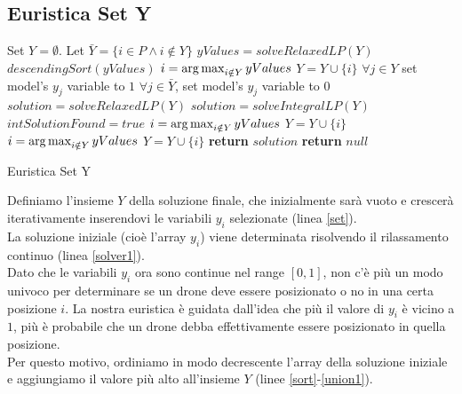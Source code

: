 \subsection{Euristica Set Y}
%
\begin{algorithm}
	\begin{algorithmic}[1]
		\State Set $ Y = \emptyset $. Let $ \bar{Y} = \{i \in P \land i \notin Y\}$ \label{set}
		\State $yValues = solveRelaxedLP(Y)$ \label{solver1}
		\State $descendingSort(yValues)$ \label{sort}
		\State $i = \operatorname*{arg\,max}_{i \notin Y} yValues $ \label{choose1} 
		\State $Y = Y \cup \{i\}$ \label{union1}
		 \label{while}
		\State $\forall j \in Y $ set model's $y_j$ variable to $1$ \label{setto1} 
		\State $\forall  j \in \bar{Y} $, set model's $y_j$ variable to $0$ \label{setto0}
		\State $solution = solveRelaxedLP(Y)$ \label{solver2}
		 \label{if1}
		\State $solution = solveIntegralLP(Y)$ \label{solvei}
		 \label{if2}
		\State $intSolutionFound = true$ \label{found}
		\Else \label{elsei}
		\State $i = \operatorname*{arg\,max}_{i \notin Y} yValues $  
		\State $Y = Y \cup \{i\}$ \label{addy1}
		\EndIf
		\Else \label{elser}
		\State $i = \operatorname*{arg\,max}_{i \notin Y} yValues $ 
		\State $Y = Y \cup \{i\}$ \label{addy2}	
		\EndIf
		\EndWhile
		 \label{ifsolved}
		\State \textbf{return} $solution$ \label{retsol}
		\Else
		\State \textbf{return} $null$
		\EndIf		
	\end{algorithmic}
	\caption{Euristica Set Y \label{alg:heuristic}}
\end{algorithm}
%
Definiamo l'insieme $Y$ della soluzione finale, che inizialmente sarà vuoto e crescerà iterativamente inserendovi le variabili $y_i$ selezionate (linea \ref{set}). \\
La soluzione iniziale (cioè l'array $y_i$) viene determinata risolvendo il rilassamento continuo (linea \ref{solver1}). \\
Dato che le variabili $y_i$ ora sono continue nel range $[0,1]$, non c'è più un modo univoco per determinare se un drone deve essere posizionato o no in una certa posizione $i$.  
La nostra euristica è guidata dall'idea che più il valore di $y_i$ è vicino a $1$, più è probabile che un drone debba effettivamente essere posizionato in quella posizione. \\
Per questo motivo, ordiniamo in modo decrescente l'array della soluzione iniziale e aggiungiamo il valore più alto all'insieme $Y$ (linee \ref{sort}-\ref{union1}). \\
